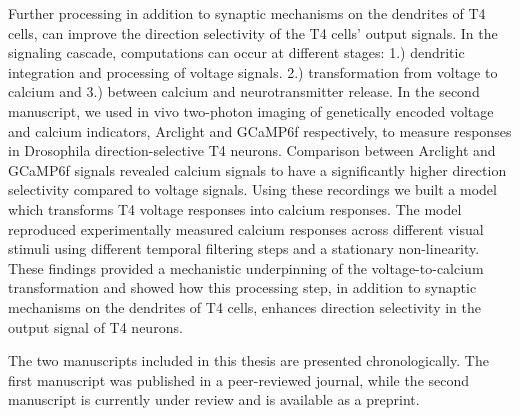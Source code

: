 Further processing in addition to synaptic mechanisms on the dendrites of T4 cells, can improve the direction selectivity of the T4 cells' output signals. In the signaling cascade, computations can occur at different stages: 1.) dendritic integration and processing of voltage signals. 2.) transformation from voltage to calcium and 3.) between calcium and neurotransmitter release. In the second manuscript, we used in vivo two-photon imaging of genetically encoded voltage and calcium indicators, Arclight and GCaMP6f respectively, to measure responses in Drosophila direction-selective T4 neurons. Comparison between Arclight and GCaMP6f signals revealed calcium signals to have a significantly higher direction selectivity compared to voltage signals. Using these recordings we built a model which transforms T4 voltage responses into calcium responses. The model reproduced experimentally measured calcium responses across different visual stimuli using different temporal filtering steps and a stationary non-linearity. These findings provided a mechanistic underpinning of the voltage-to-calcium transformation and showed how this processing step, in addition to synaptic mechanisms on the dendrites of T4 cells, enhances direction selectivity in the output signal of T4 neurons.

The two manuscripts included in this thesis are presented chronologically. The first manuscript was published in a peer-reviewed journal, while the second manuscript is currently under review and is available as a preprint. 


% 


\vfill


\endgroup			

\vfill

